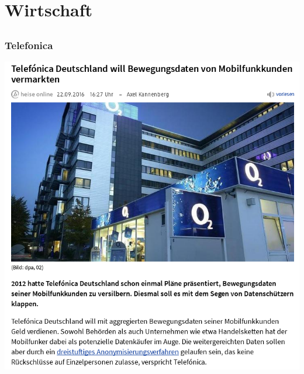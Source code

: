 \documentclass[12pt]{beamer}
\begin{document}
\begin{frame}
\begin{center}
{    }
  \end{center}
\end{frame}

\section{Wirtschaft}
\subsection{}

\begin{frame}
  \frametitle{Telefonica}
  \pause
  \begin{center}
    \includegraphics[height=0.7\textheight]{img/telefonica.png}
  \end{center}
\end{frame}
\end{document}
